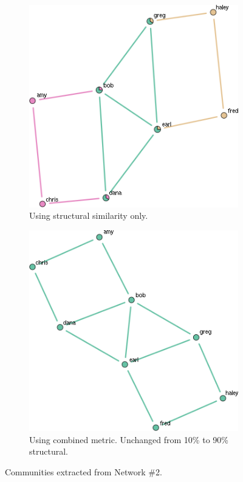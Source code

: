 \documentclass{report} %
\begin{document}
\begin{figure}[htp!]
  \centering
  \begin{subfigure}{.5\textwidth}
    \centering
    \includegraphics[width=.8\linewidth]{toy3/no_ea/edge_comm.png}
    \caption{Using structural similarity only.}
    \label{fig:net2_comm_struct}
  \end{subfigure}%
  \begin{subfigure}{.5\textwidth}
    \centering
    \includegraphics[width=.8\linewidth]{toy3/ea/edge_comm_0.25.png}
    \caption{Using combined metric. Unchanged from 10\% to 90\% structural.}
    \label{fig:net2_comm_both}
  \end{subfigure}
  \caption{Communities extracted from Network \#2.}
  \label{fig:net2_comm}
\end{figure}
\end{document}
